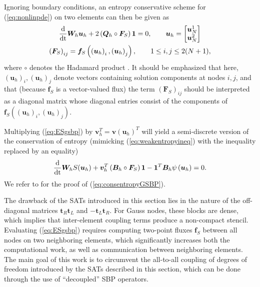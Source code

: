 \documentclass[review,onefignum,onetabnum,final]{siamart171218}
\newcommand{\td}[2]{\frac{{\rm d}#1}{{\rm d}{\rm #2}}}
\newcommand{\LRp}[1]{\left( #1 \right)}
\newcommand{\note}[1]{{\color{blue}{#1}}}
\begin{document}
Ignoring boundary conditions, an entropy conservative scheme for (\ref{eq:nonlinpde}) on two elements can then be given as
\begin{gather}
\td{}{t}\bm{W}_h\bm{u}_h + 2\LRp{\bm{Q}_h \circ \bm{F}_S}\bm{1} = 0, \qquad \bm{u}_h = \begin{bmatrix}
\bm{u}^1_N\\
\bm{u}^2_N
\end{bmatrix} \label{eq:ESgsbp} \\
\LRp{\bm{F}_S}_{ij} = \bm{f}_S\LRp{\LRp{\bm{u}_h}_i,\LRp{\bm{u}_h}_j}, \qquad 1 \leq  i,j \leq 2(N+1), \nonumber
\end{gather}
where $\circ$ denotes the Hadamard product \cite{horn2012matrix}.  {It should be emphasized that here, $(\bm{u}_h)_i, (\bm{u}_h)_j$ denote vectors containing solution components at nodes $i,j$, and that (because $\bm{f}_S$ is a vector-valued flux) the term $\LRp{\bm{F}_S}_{ij}$ should be interpreted as a diagonal matrix whose diagonal entries consist of the components of $\bm{f}_S\LRp{(\bm{u}_h)_i, (\bm{u}_h)_j}$.}

Multiplying (\ref{eq:ESgsbp}) by $\bm{v}_h^T = \bm{v}\LRp{\bm{u}_h}^T$ 
will yield a semi-discrete version of the conservation of entropy (mimicking (\ref{eq:weakentropyineq}) with the inequality replaced by an equality)
\begin{equation}
\label{eq:consentropyGSBP}
\td{}{t}\bm{W}_h S(\bm{u}_h) + \bm{v}_h^T\LRp{\bm{B}_h\circ \bm{F}_S}\bm{1} -\bm{1}^T\bm{B}_h\psi\LRp{\bm{u}_h} = 0.
\end{equation}
We refer to \cite{crean2017high, crean2018entropy} for the proof of (\ref{eq:consentropyGSBP}).  

The drawback of the SATs introduced in this section lies in the nature of the off-diagonal matrices $\bm{t}_R\bm{t}_L$ and $-\bm{t}_L\bm{t}_R$.  For Gauss nodes, these blocks are dense, which implies that inter-element coupling terms produce a non-compact stencil.  Evaluating (\ref{eq:ESgsbp}) requires computing two-point fluxes $\bm{f}_S$ between all nodes on two neighboring elements, which significantly increases both the computational work, as well as communication between neighboring elements.  The main goal of this work is to circumvent the all-to-all coupling of degrees of freedom introduced by the SATs described in this section, which can be done through the use of ``decoupled'' SBP operators.  
\end{document}
